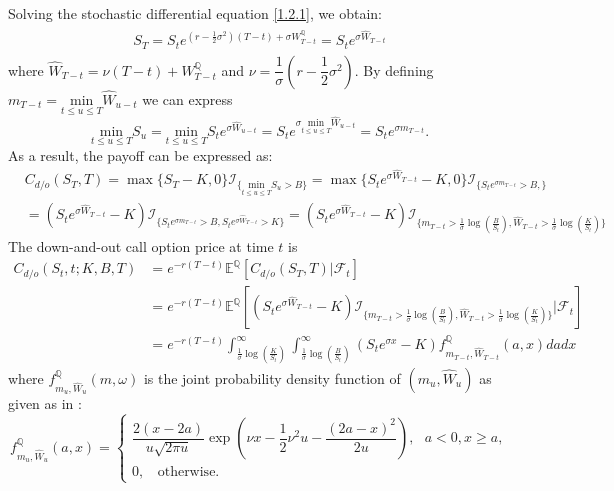 \documentclass[12pt]{article}
\def\min{{\mbox{min}}}
\begin{document}
Solving the stochastic differential equation \eqref{1.2.1}, we obtain:
\begin{align}
	\begin{split}
		S_T=S_te^{\left(r -\frac{1}{2}\sigma^2 \right)(T-t)+\sigma W_{T-t}^\mathbb{Q}}=
	S_te^{\sigma \widehat{W}_{T-t}}
	\end{split} \label{eq4.1.1}
\end{align} 
where $\widehat{W}_{T-t}=\nu (T-t)+W_{T-t}^\mathbb{Q}$ and $\nu=\dfrac{1}{\sigma}(r-\dfrac{1}{2}\sigma^2)$. By defining
$
	m_{T-t}=\underset{t\leq u \leq T}\min\widehat{W}_{u-t}
$
we can express 
$$
	\underset{t\leq u \leq T}\min S_u=\underset{t\leq u \leq T}\min S_te^{\sigma \widehat{W}_{u-t}} 
	=S_te^{\sigma \underset{t\leq u \leq T}\min\widehat{W}_{u-t}}
	=S_te^{\sigma 	m_{T-t}}.
$$
As a result, the payoff can be expressed as: 
\begin{align*}
	&C_{d/o}(S_T,T)=\max\{S_T-K, 0\}\mathcal{I}_{\{\underset{t\leq u\leq T}\min S_u > B\}}
	=\max\{S_te^{\sigma \widehat{W}_{T-t}}-K, 0\}\mathcal{I}_{\{S_te^{\sigma 	m_{T-t}} > B, \}}\\
	&=(S_te^{\sigma \widehat{W}_{T-t}}-K)\mathcal{I}_{\{S_te^{\sigma m_{T-t}} > B, S_te^{\sigma \widehat{W}_{T-t}}> K\}}
	=(S_te^{\sigma \widehat{W}_{T-t}}-K)\mathcal{I}_{\{m_{T-t}>\frac{1}{\sigma}\log \left(\frac{B}{S_t}\right), \widehat{W}_{T-t}>\frac{1}{\sigma}\log\left(\frac{K}{S_t}\right) \}}
\end{align*}
The down-and-out call option price at time $t$ is
\begin{align*}
	C_{d/o}(S_t,t;K,B,T) &= e^{-r(T-t)}\mathbb{E}^\mathbb{Q}\left[C_{d/o}(S_T,T)|\mathcal{F}_t\right]\\
	&=e^{-r(T-t)}\mathbb{E}^\mathbb{Q}\left[(S_te^{\sigma \widehat{W}_{T-t}}-K)\mathcal{I}_{\{m_{T-t}>\frac{1}{\sigma}\log\left(\frac{B}{S_t}\right), \widehat{W}_{T-t}>\frac{1}{\sigma}\log\left(\frac{K}{S_t}\right) \}}\bigg|\mathcal{F}_t\right]\\
	&=e^{-r(T-t)}\displaystyle \int_{\frac{1}{\sigma}\log\left(\frac{K}{S_t}\right) }^{\infty}\displaystyle \int_{\frac{1}{\sigma}\log\left(\frac{B}{S_t}\right) }^{\infty}(S_te^{\sigma x}-K)f^\mathbb{Q}_{m_{T-t},\widehat{W}_{T-t}}(a, x)dadx
\end{align*}
where $f^\mathbb{Q}_{m_u,\widehat{W}_u}(m, \omega)$ is the joint probability density function of $(m_u, \widehat{W}_u)$ as given as in \citet[p. 212]{StochasticEric}:
$$f^\mathbb{Q}_{m_u,\widehat{W}_u}(a, x)= \begin{cases}
\dfrac{2(x-2a)}{u\sqrt{2\pi u}}\exp(\nu x-\dfrac12\nu^2u-\dfrac{(2a-x)^2}{2u}),~~~ a< 0, x\ge a,\\ 
0, ~~~~\text{otherwise}.
\end{cases}$$
\end{document}
